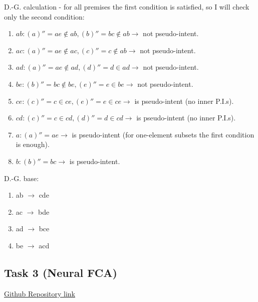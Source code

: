 D.-G. calculation - for all premises the first condition is satisfied, so I will check only the second condition:
\begin{enumerate}
\item $ab: (a)'' = ae \notin ab, (b)'' = bc \notin ab \rightarrow$ not pseudo-intent.
\item $ac: (a)'' = ae \notin ac, (c)'' = c \notin ab \rightarrow$ not pseudo-intent.
\item $ad: (a)'' = ae \notin ad, (d)'' = d \in ad \rightarrow$ not pseudo-intent.
\item $be: (b)'' = bc \notin be, (e)'' = e \in be \rightarrow$ not pseudo-intent.
\item $ce: (c)'' = c \in ce, (e)'' = e \in ce \rightarrow$ is pseudo-intent (no inner P.I.s).
\item $cd: (c)'' = c \in cd, (d)'' = d \in cd \rightarrow$ is pseudo-intent (no inner P.I.s).
\item $a: (a)'' = ae \rightarrow$ is pseudo-intent (for one-element subsets the first condition is enough).
\item $b: (b)'' = bc \rightarrow$ is pseudo-intent.
\end{enumerate}

D.-G. base:
\begin{enumerate}
\item ab $\rightarrow$ cde
\item ac $\rightarrow$ bde
\item ad $\rightarrow$ bce
\item be $\rightarrow$ acd
\end{enumerate}

\subsection{Task 3 (Neural FCA)}

\href{https://github.com/Chpel/Maga/tree/main/OSDA\%20.ipynb/Big\%20homework}{Github Repository link}
